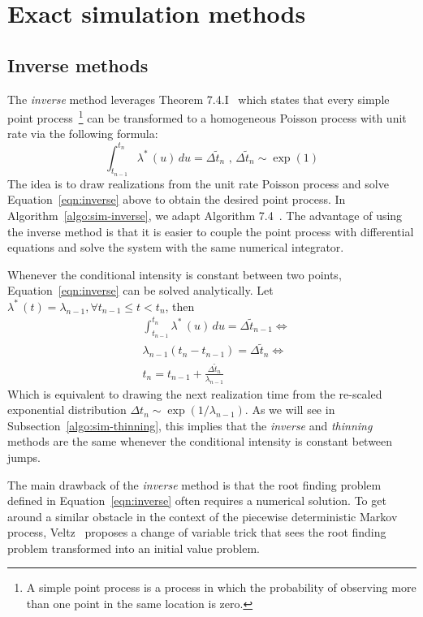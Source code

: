 \documentclass{juliacon}
\begin{document}
\section{Exact simulation methods} \label{sec:method-exact}

\subsection{Inverse methods} \label{subsec:sim-inverse}

The \textit{inverse} method leverages Theorem 7.4.I~\cite{daley2003} which states that every simple point process~\footnote{A simple point process is a process in which the probability of observing more than one point in the same location is zero.} can be transformed to a homogeneous Poisson process with unit rate via the following formula:
\begin{equation} \label{eqn:inverse}
  \int_{t_{n-1}}^{t_n} \lambda^\ast \, (u) \, du = \Delta \tilde{t}_n \text{ , } \Delta \tilde{t}_n \sim \exp(1)
\end{equation}
The idea is to draw realizations from the unit rate Poisson process and solve Equation~\ref{eqn:inverse} above to obtain the desired point process. In Algorithm~\ref{algo:sim-inverse}, we adapt Algorithm 7.4~\cite{daley2003}. The advantage of using the inverse method is that it is easier to couple the point process with differential equations and solve the system with the same numerical integrator.


Whenever the conditional intensity is constant between two points, Equation~\ref{eqn:inverse} can be solved analytically. Let \( \lambda^\ast \, (t) = \lambda_{n-1} , \forall t_{n-1} \leq t < t_n \), then
\[
\begin{split}
  &\int_{t_{n-1}}^{t_n} \lambda^\ast \, (u) \, du = \Delta \tilde{t}_{n-1} \iff \\
  &\lambda_{n-1} (t_n - t_{n-1}) = \Delta \tilde{t}_n \iff \\
  &t_n = t_{n-1} + \frac{\Delta \tilde{t}_n}{\lambda_{n-1}}
\end{split}
\]
Which is equivalent to drawing the next realization time from the re-scaled exponential distribution \( \Delta t_n \sim \exp(1/\lambda_{n-1}) \). As we will see in Subsection~\ref{algo:sim-thinning}, this implies that the \textit{inverse} and \textit{thinning} methods are the same whenever the conditional intensity is constant between jumps.

The main drawback of the \textit{inverse} method is that the root finding problem defined in Equation~\ref{eqn:inverse} often requires a numerical solution. To get around a similar obstacle in the context of the piecewise deterministic Markov process, Veltz~\cite{veltz2015} proposes a change of variable trick that sees the root finding problem transformed into an initial value problem. 
\end{document}
